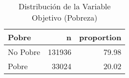 \begin{table}[ht]
\centering
\begin{tabular}{lrr}
  \toprule
Pobre & n & proportion \\ 
  \midrule
No Pobre & 131936 & 79.98 \\ 
  Pobre & 33024 & 20.02 \\ 
   \bottomrule
\end{tabular}
\caption{Distribución de la Variable Objetivo (Pobreza)} 
\label{tab:poverty_distribution}
\end{table}
